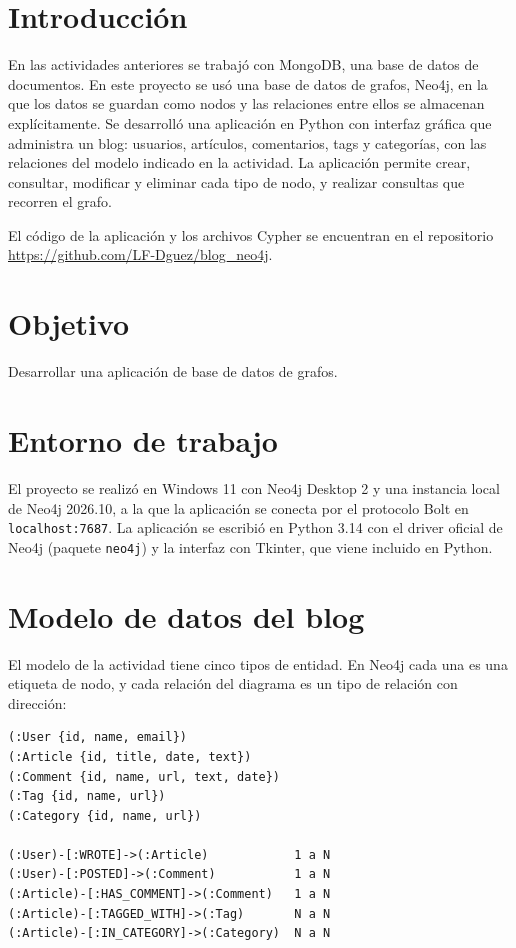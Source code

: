 \documentclass[12pt]{article}
\begin{document}
\section{Introducción}

En las actividades anteriores se trabajó con MongoDB, una base de datos de documentos. En este proyecto se usó una base de datos de grafos, Neo4j, en la que los datos se guardan como nodos y las relaciones entre ellos se almacenan explícitamente. Se desarrolló una aplicación en Python con interfaz gráfica que administra un blog: usuarios, artículos, comentarios, tags y categorías, con las relaciones del modelo indicado en la actividad. La aplicación permite crear, consultar, modificar y eliminar cada tipo de nodo, y realizar consultas que recorren el grafo.

El código de la aplicación y los archivos Cypher se encuentran en el repositorio \url{https://github.com/LF-Dguez/blog_neo4j}.

\section{Objetivo}

Desarrollar una aplicación de base de datos de grafos.

\section{Entorno de trabajo}

El proyecto se realizó en Windows 11 con Neo4j Desktop 2 y una instancia local de Neo4j 2026.10, a la que la aplicación se conecta por el protocolo Bolt en \texttt{localhost:7687}. La aplicación se escribió en Python 3.14 con el driver oficial de Neo4j (paquete \texttt{neo4j}) y la interfaz con Tkinter, que viene incluido en Python.

\section{Modelo de datos del blog}

El modelo de la actividad tiene cinco tipos de entidad. En Neo4j cada una es una etiqueta de nodo, y cada relación del diagrama es un tipo de relación con dirección:

\begin{lstlisting}[style=plainStyle]
(:User {id, name, email})
(:Article {id, title, date, text})
(:Comment {id, name, url, text, date})
(:Tag {id, name, url})
(:Category {id, name, url})

(:User)-[:WROTE]->(:Article)            1 a N
(:User)-[:POSTED]->(:Comment)           1 a N
(:Article)-[:HAS_COMMENT]->(:Comment)   1 a N
(:Article)-[:TAGGED_WITH]->(:Tag)       N a N
(:Article)-[:IN_CATEGORY]->(:Category)  N a N
\end{lstlisting}
\end{document}

